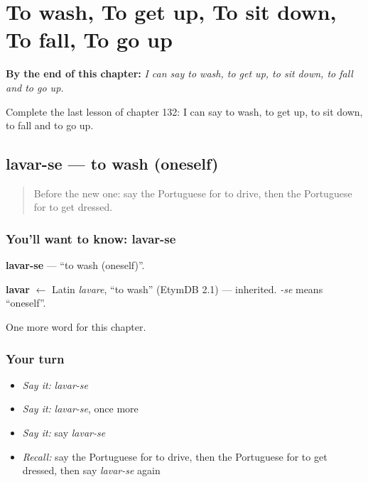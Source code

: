 
\chapter{To wash, To get up, To sit down, To fall, To go up}
\label{ch:pt-to-wash-to-get-up-to-sit-down-to-fall-to-go-up}

\begin{chapteropening}
\textbf{By the end of this chapter:} \emph{I can say to wash, to get up, to sit down, to fall and to go up.}

Complete the last lesson of chapter 132: I can say to wash, to get up, to sit down, to fall and to go up.
\end{chapteropening}

\section[lavar-se]{lavar-se — to wash (oneself)}

\label{lesson:PT-C132-lavar-se}



\begin{quote}
Before the new one: say the Portuguese for to drive, then the Portuguese for to get dressed.
\end{quote}

\subsection*{You'll want to know: lavar-se}
\textbf{lavar-se} — \textquotedblleft{}to wash (oneself)\textquotedblright{}.

\begin{cousinweb}
\textbf{lavar} $\leftarrow$ Latin \emph{lavare}, \textquotedblleft{}to wash\textquotedblright{} (EtymDB 2.1) — inherited. \emph{-se} means \textquotedblleft{}oneself\textquotedblright{}.
\end{cousinweb}

\begin{grammarlens}[title={What you've built}]
One more word for this chapter.
\end{grammarlens}

\subsection*{Your turn}
\begin{itemize}
\raggedright
  \item \emph{Say it:} \emph{lavar-se}
  \item \emph{Say it:} \emph{lavar-se}, once more
  \item \emph{Say it:} say \emph{lavar-se}
  \item \emph{Recall:} say the Portuguese for to drive, then the Portuguese for to get dressed, then say \emph{lavar-se} again
\end{itemize}

